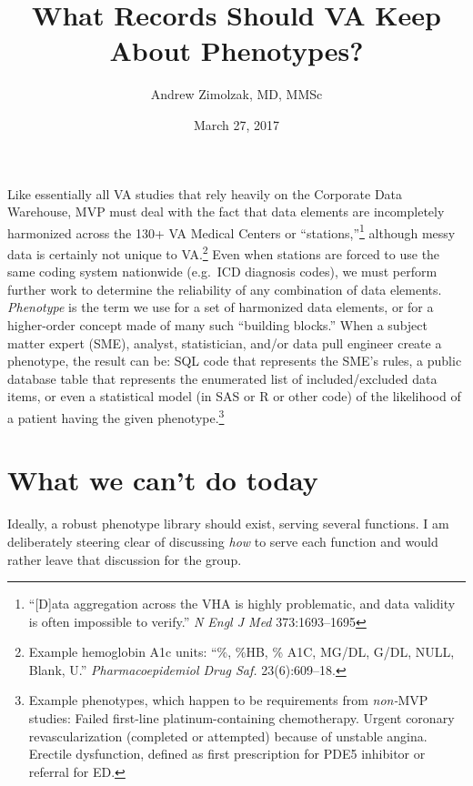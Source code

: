 \documentclass{tufte-handout}
\title{What Records Should VA Keep About Phenotypes?}
\author{Andrew Zimolzak, MD, MMSc}
\date{March 27, 2017}
\begin{document}
\maketitle

Like essentially all VA studies that rely heavily on the Corporate
Data Warehouse, MVP must deal with the fact that data elements are
incompletely harmonized across the 130+ VA Medical Centers or
``stations,''\footnote{``[D]ata aggregation across the VHA is highly
  problematic, and data validity is often impossible to verify.''
  \emph{N Engl J Med} 373:1693--1695} although messy data is certainly
not unique to VA.\footnote{Example hemoglobin A1c units: ``\%, \%HB,
  \% A1C, MG/DL, G/DL, NULL, Blank, U.'' \emph{Pharmacoepidemiol Drug
    Saf.} 23(6):609--18.} Even when stations are forced to use the
same coding system nationwide (e.g.\ ICD diagnosis codes), we must
perform further work to determine the reliability of any combination
of data elements. \emph{Phenotype} is the term we use for a set of
harmonized data elements, or for a higher-order concept made of many such
``building blocks.'' When a subject matter expert (SME), analyst,
statistician, and/or data pull engineer create a phenotype, the result
can be: SQL code that represents the SME's rules, a public database
table that represents the enumerated list of included\slash excluded
data items, or even a statistical model (in SAS or R or other code) of
the likelihood of a patient having the given
phenotype.\footnote{Example phenotypes, which happen to be
  requirements from \emph{non-}MVP studies: Failed first-line
  platinum-containing chemotherapy. Urgent coronary revascularization
  (completed or attempted) because of unstable angina. Erectile
  dysfunction, defined as first prescription for PDE5 inhibitor or
  referral for ED.}

\section{What we can't do today}

Ideally, a robust phenotype library should exist, serving several
functions. I am deliberately steering clear of discussing \emph{how}
to serve each function and would rather leave that discussion for the
group.
\end{document}
